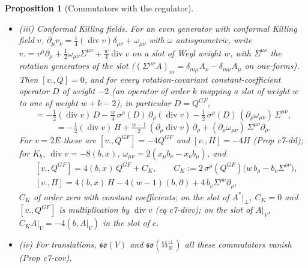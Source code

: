 \documentclass[11pt]{article}
\numberwithin{equation}{section}
\theoremstyle{plain}
\newtheorem{proposition}[theorem]{Proposition}
\theoremstyle{definition}
\newcommand{\AV}{A|_V}
\begin{document}
\begin{proposition}[Commutators with the regulator]
\begin{itemize}
\item (iii) Conformal Killing fields. For an even generator with conformal Killing field $v$, $\partial_\mu v_\nu=\tfrac14(\operatorname{div}v)\delta_{\mu\nu}+\omega_{\mu\nu}$ with $\omega$ antisymmetric, write $v.=v^\mu\partial_\mu+\tfrac12\omega_{\mu\nu}\Sigma^{\mu\nu}+\tfrac w4\operatorname{div}v$ on a slot of Weyl weight $w$, with $\Sigma^{\mu\nu}$ the rotation generators of the slot ($(\Sigma^{\mu\nu}A)_m=\delta_{m\mu}A_\nu-\delta_{m\nu}A_\mu$ on one-forms). Then $[v.,Q]=0$, and for every rotation-covariant constant-coefficient operator $D$ of weight $-2$ (an operator of order $k$ mapping a slot of weight $w$ to one of weight $w+k-2$), in particular $D=Q^{GF}$,
\begin{equation}
[v.,D]=-\tfrac12(\operatorname{div}v)\,D-\tfrac w4\,\sigma^\rho(D)\,\partial_\rho(\operatorname{div}v)-\tfrac12\,\sigma^\rho(D)\,(\partial_\rho\omega_{\mu\nu})\,\Sigma^{\mu\nu},
\label{eq:qs-vD}
\end{equation}
\begin{equation}
[v.,H]=-\tfrac12(\operatorname{div}v)\,H+\tfrac{w-1}2\,(\partial_\rho\operatorname{div}v)\,\partial_\rho+(\partial_\rho\omega_{\mu\nu})\,\Sigma^{\mu\nu}\partial_\rho .
\label{eq:qs-vH}
\end{equation}
For $v=2E$ these are $[v.,Q^{GF}]=-4Q^{GF}$ and $[v.,H]=-4H$ (Prop c7-dil); for $K_b$, $\operatorname{div}v=-8(b,x)$, $\omega_{\mu\nu}=2(x_\mu b_\nu-x_\nu b_\mu)$, and
\begin{equation}
\begin{aligned}
&[v.,Q^{GF}]=4(b,x)\,Q^{GF}+C_K,\qquad C_K:=2\,\sigma^\rho(Q^{GF})\big(w\,b_\rho-b_\nu\Sigma^{\rho\nu}\big),\\
&[v.,H]=4(b,x)\,H-4(w-1)(b,\partial)+4\,b_\nu\Sigma^{\rho\nu}\partial_\rho ,
\end{aligned}
\label{eq:qs-Kcomm}
\end{equation}
$C_K$ of order zero with constant coefficients; on the slot of $A^*|_\perp$, $C_K=0$ and $[v.,Q^{GF}]$ is multiplication by $\operatorname{div}v$ (eq c7-divv); on the slot of $\AV$, $C_K\AV=-4(b,\AV)$ in the slot of $c$.
\item (iv) For translations, $\mathfrak{so}(V)$ and $\mathfrak{so}(W_{\mathbb R}^\perp)$ all these commutators vanish (Prop c7-cov).
\end{itemize}
\end{proposition}
\end{document}
